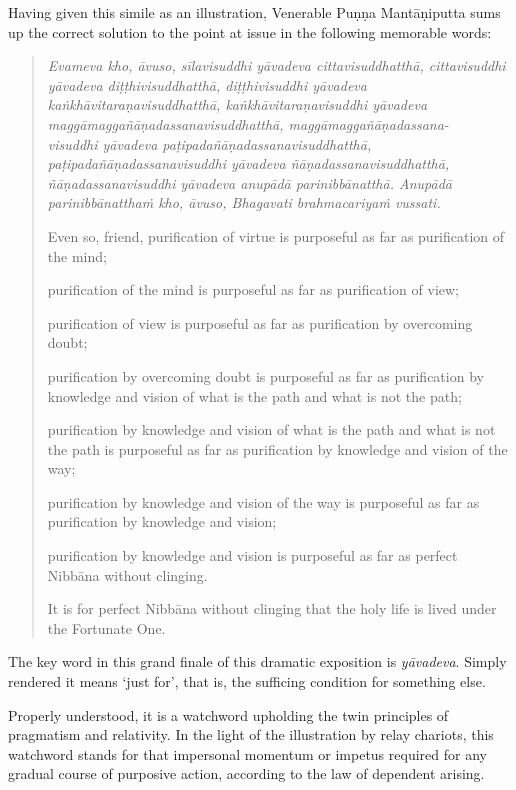 Having given this simile as an illustration, Venerable Puṇṇa Mantāṇiputta sums up the correct solution to the point at issue in the following memorable words:

\enlargethispage{\baselineskip}

\begin{quote}
\emph{Evameva kho, āvuso, sīlavisuddhi yāvadeva cittavisuddhatthā,
cittavisuddhi yāvadeva diṭṭhivisuddhatthā,
diṭṭhivisuddhi yāvadeva kaṅkhāvitaraṇavisuddhatthā,
kaṅkhāvitaraṇavisuddhi yāvadeva maggāmaggañāṇadassanavisuddhatthā,
maggāmaggañāṇadassana-\\ visuddhi yāvadeva paṭipadañāṇadassanavisuddhatthā,
paṭipadañāṇadassanavisuddhi yāvadeva ñāṇadassanavisuddhatthā,
ñāṇadassanavisuddhi yāvadeva anupādā parinibbānatthā.
Anupādā parinibbānatthaṁ kho, āvuso, Bhagavati brahmacariyaṁ vussati.}

Even so, friend, purification of virtue is purposeful as far as purification of the mind;

purification of the mind is purposeful as far as purification of view;

purification of view is purposeful as far as purification by overcoming doubt;

purification by overcoming doubt is purposeful as far as purification by knowledge and vision of what is the path and what is not the path;

purification by knowledge and vision of what is the path and what is not the path is purposeful as far as purification by knowledge and vision of the way;

purification by knowledge and vision of the way is purposeful as far as purification by knowledge and vision;

purification by knowledge and vision is purposeful as far as perfect Nibbāna without clinging.

It is for perfect Nibbāna without clinging that the holy life is lived under the Fortunate One.
\end{quote}

The key word in this grand finale of this dramatic exposition is \emph{yāvadeva}. Simply rendered it means `just for', that is, the sufficing condition for something else.

Properly understood, it is a watchword upholding the twin principles of pragmatism and relativity. In the light of the illustration by relay chariots, this watchword stands for that impersonal momentum or impetus required for any gradual course of purposive action, according to the law of dependent arising.

